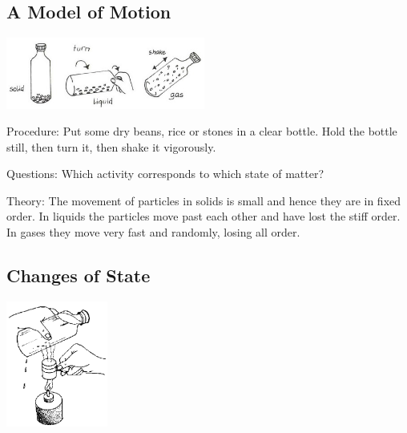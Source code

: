 \begin{multicols}{2}
\subsection{A Model of Motion}

\begin{center}
\includegraphics[width=0.49\textwidth]{./img/vso/motion-model.jpg}
\end{center}

\begin{description*}
\item[Procedure:]{Put some dry beans, rice or stones in a clear bottle. Hold the bottle still, then turn it, then shake it vigorously.}
\item[Questions:]{Which activity corresponds to which state of matter?}
\item[Theory:]{The movement of particles in solids is small and hence they are in fixed order. In liquids the particles move past each other and have lost the stiff order. In gases they move very fast and randomly, losing all order.}
\end{description*}

\subsection{Changes of State} 

\begin{center}
\includegraphics[width=0.25\textwidth]{./img/source/change-state.png}
\end{center}


\end{multicols}
